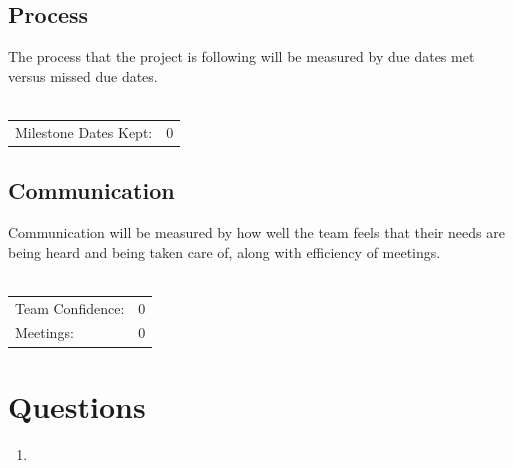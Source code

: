 \documentclass{article}
\begin{document}
\subsection{Process}
The process that the project is following will be measured by due dates met versus missed due dates.\\ \\
\begin{tabular}{l r}
Milestone Dates Kept: & 0 \\
\end{tabular}

\subsection{Communication}
Communication will be measured by how well the team feels that their needs are being heard and being taken care of, along with efficiency of meetings.\\ \\
\begin{tabular}{l r}
Team Confidence: & 0 \\
Meetings: & 0 \\
\end{tabular}

\clearpage

\section{Questions}

\begin{enumerate}[label*=6.\arabic*]
\item
\end{enumerate}
\end{document}
